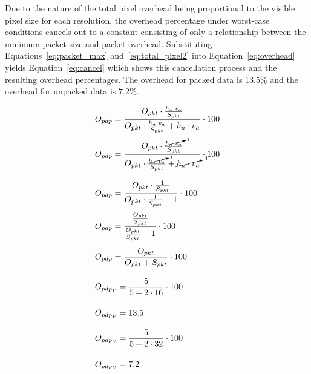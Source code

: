     Due to the nature of the total pixel overhead being proportional to the visible pixel size for each resolution, the overhead percentage under worst-case conditions cancels out to a constant consisting of only a relationship between the minimum packet size and packet overhead. Substituting Equations~\ref{eq:packet_max} and~\ref{eq:total_pixel2} into Equation~\ref{eq:overhead} yields Equation~\ref{eq:cancel} which shows this cancellation process and the resulting overhead percentages. The overhead for packed data is $13.5\%$ and the overhead for unpacked data is $7.2\%$.

    \begin{equation}
        \begin{array}{ l }
            \displaystyle O_{pdp}=\frac{O_{pkt}\cdot \frac{h_a \cdot v_a}{S_{pkt}}}{O_{pkt} \cdot \frac{h_a \cdot v_a}{S_{pkt}} + h_a \cdot v_a} \cdot 100 \\[16pt]
            \displaystyle O_{pdp}=\frac{O_{pkt}\cdot \frac{\cancelto{1}{h_a \cdot v_a}}{S_{pkt}}}{O_{pkt} \cdot \frac{\cancelto{1}{h_a \cdot v_a}}{S_{pkt}} + \cancelto{1}{h_a \cdot v_a}} \cdot 100 \\[25pt]
            \displaystyle O_{pdp}=\frac{O_{pkt}\cdot \frac{1}{S_{pkt}}}{O_{pkt} \cdot \frac{1}{S_{pkt}} + 1} \cdot 100 \\[16pt]
            \displaystyle O_{pdp}=\frac{\frac{O_{pkt}}{S_{pkt}}}{\frac{O_{pkt}}{S_{pkt}} + 1} \cdot 100 \\[19pt]
            \displaystyle O_{pdp}=\frac{O_{pkt}}{O_{pkt}+S_{pkt}} \cdot 100 \\[19pt]
            \displaystyle O_{pdp_P}=\frac{5}{5 + 2 \cdot 16} \cdot 100 \\[19pt]
            \displaystyle O_{pdp_P}=13.5 \\[13pt]
            \displaystyle O_{pdp_U}=\frac{5}{5 + 2 \cdot 32} \cdot 100 \\[19pt]
            \displaystyle O_{pdp_U}=7.2 \\[13pt]
        \end{array}
        \label{eq:cancel}
    \end{equation}

